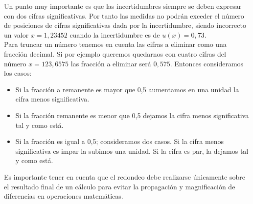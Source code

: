 \documentclass[12pt,a4paper]{book}
\begin{document}
Un punto muy importante es que las incertidumbres siempre se deben expresar con dos cifras significativas. Por tanto las medidas no podrán exceder el número de posiciones de cifras significativas dada por la incertidumbre, siendo incorrecto un valor $x=1,23452$
cuando la incertidumbre es de $u(x) = 0,73$. \\

Para truncar un número tenemos en cuenta las cifras a eliminar como una fracción decimal. Si por ejemplo queremos quedarnos con cuatro cifras del número $x=123,6575$ las fracción a eliminar será $0,575$. Entonces consideramos los casos:

\begin{itemize}
\item Si la fracción a remanente es mayor que 0,5 aumentamos en una unidad la cifra menos significativa.

\item Si la fracción remanente es menor que 0,5 dejamos la cifra menos significativa tal y como está.

\item Si la fracción es igual a 0,5; consideramos dos casos. Si la cifra menos significativa es impar la subimos una unidad. Si la cifra es par, la dejamos tal y como está.
\end{itemize}

Es importante tener en cuenta que el redondeo debe realizarse únicamente sobre el resultado final de un cálculo para evitar la propagación y magnificación de diferencias en operaciones matemáticas. 
















\newpage
\end{document}
